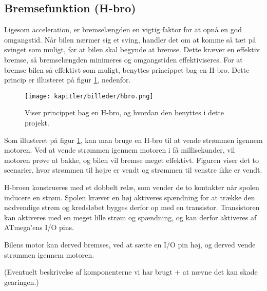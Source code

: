 
\subsection{Bremsefunktion (H-bro)}

Ligesom acceleration, er bremselængden en vigtig faktor for at opnå en god omgangstid.
Når bilen nærmer sig et sving, handler det om at komme så tæt på svinget som muligt, før at bilen
skal begynde at bremse. Dette kræver en effektiv bremse, så bremselængden minimeres og omgangstiden effektiviseres.
For at bremse bilen så effektivt som muligt, benyttes princippet bag en H-bro. Dette princip er illusteret
på figur \ref{fig:hbro}, nedenfor.

\begin{figure}[ht]
    \centering
    \texttt{[image: kapitler/billeder/hbro.png]}
    \caption{Viser princippet bag en H-bro, og hvordan den benyttes i dette projekt.}
    \label{fig:hbro}
\end{figure}

Som illusteret på figur \ref{fig:hbro}, kan man bruge en H-bro til at vende strømmen igennem motoren.
Ved at vende strømmen igennem motoren i få millisekunder, vil motoren prøve at bakke,
og bilen vil bremse meget effektivt. Figuren viser det to scenarier, hvor strømmen til højre er vendt
og strømmen til venstre ikke er vendt.

H-broen konstrueres med et dobbelt relæ, som vender de to kontakter når spolen inducere en strøm.
Spolen kræver en høj aktiveres spændning for at trække den nødvendige strøm
og kredsløbet bygges derfor op med en transistor.
Transistoren kan aktiveres med en meget lille strøm og spændning, og kan derfor aktiveres
af ATmega'ens I/O pins.

Bilens motor kan derved bremses, ved at sætte en I/O pin høj, og derved vende strømmen igennem motoren.

(Eventuelt beskrivelse af komponenterne vi har brugt + at nævne det kan skade gearingen.)
